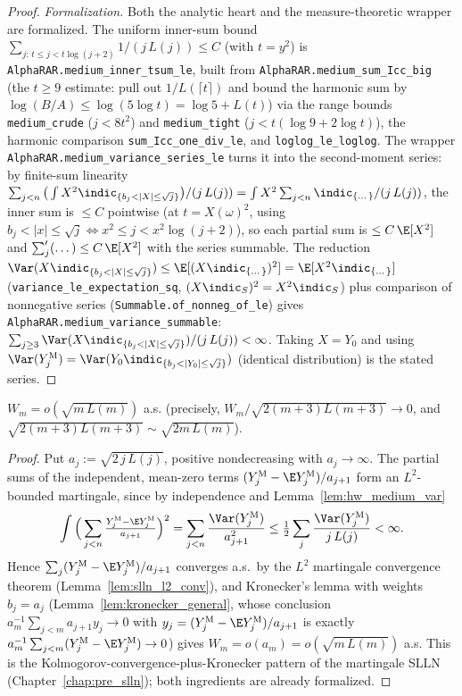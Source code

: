 \begin{proof}
\emph{Formalization.} Both the analytic heart and the measure-theoretic wrapper are formalized.
The uniform inner-sum bound $\sum_{j:\,t\le j<t\log(j+2)}1/(j\,L(j))\le C$ (with $t=y^2$) is
\texttt{AlphaRAR.medium\_inner\_tsum\_le}, built from \texttt{AlphaRAR.medium\_sum\_Icc\_big} (the
$t\ge9$ estimate: pull out $1/L(\lceil t\rceil)$ and bound the harmonic sum by
$\log(B/A)\le\log(5\log t)=\log5+L(t)$) via the range bounds \texttt{medium\_crude} ($j<8t^2$) and
\texttt{medium\_tight} ($j<t(\log9+2\log t)$), the harmonic comparison
\texttt{sum\_Icc\_one\_div\_le}, and \texttt{loglog\_le\_loglog}. The wrapper
\texttt{AlphaRAR.medium\_variance\_series\_le} turns it into the second-moment series: by finite-sum
linearity $\sum_{j<n}\big(\int X^2\indic_{\{b_j<|X|\le\sqrt j\}}\big)/(j\,L(j))=\int X^2\sum_{j<n}
\indic_{\{\dots\}}/(j\,L(j))$, the inner sum is $\le C$ pointwise (at $t=X(\omega)^2$, using
$b_j<|x|\le\sqrt j\iff x^2\le j<x^2\log(j+2)$), so each partial sum is $\le C\,\E[X^2]$ and
$\sum'_j(\dots)\le C\,\E[X^2]$ with the series summable. The reduction
$\Var(X\indic_{\{b_j<|X|\le\sqrt j\}})\le\E[(X\indic_{\{\dots\}})^2]=\E[X^2\indic_{\{\dots\}}]$
(\texttt{variance\_le\_expectation\_sq}, $(X\indic_S)^2=X^2\indic_S$) plus comparison of nonnegative
series (\texttt{Summable.of\_nonneg\_of\_le}) gives \texttt{AlphaRAR.medium\_variance\_summable}:
$\sum_{j\ge3}\Var(X\indic_{\{b_j<|X|\le\sqrt j\}})/(j\,L(j))<\infty$. Taking $X=Y_0$ and using
$\Var(Y_j^{\mathrm M})=\Var(Y_0\indic_{\{b_j<|Y_0|\le\sqrt j\}})$ (identical distribution) is the
stated series.
\end{proof}

\begin{lemma}\label{lem:hw_medium}
\leanok
{}
$W_m=o(\sqrt{m\,L(m)})$ a.s. (precisely, $W_m/\sqrt{2(m+3)L(m+3)}\to0$, and
$\sqrt{2(m+3)L(m+3)}\sim\sqrt{2m\,L(m)}$).
\end{lemma}
\begin{proof}
Put $a_j:=\sqrt{2\,j\,L(j)}$, positive nondecreasing with $a_j\to\infty$. The partial
sums of the independent, mean-zero terms $(Y_j^{\mathrm M}-\E Y_j^{\mathrm M})/a_{j+1}$
form an $L^2$-bounded martingale, since by independence and Lemma~\ref{lem:hw_medium_var}
\[
  \int\Big(\sum_{j<n}\tfrac{Y_j^{\mathrm M}-\E Y_j^{\mathrm M}}{a_{j+1}}\Big)^2
  =\sum_{j<n}\frac{\Var(Y_j^{\mathrm M})}{a_{j+1}^2}
  \le\tfrac12\sum_{j}\frac{\Var(Y_j^{\mathrm M})}{j\,L(j)}<\infty .
\]
Hence $\sum_j(Y_j^{\mathrm M}-\E Y_j^{\mathrm M})/a_{j+1}$ converges a.s.\ by the $L^2$
martingale convergence theorem (Lemma~\ref{lem:slln_l2_conv}), and Kronecker's lemma with
weights $b_j=a_j$ (Lemma~\ref{lem:kronecker_general}, whose conclusion
$a_m^{-1}\sum_{j<m}a_{j+1}y_j\to0$ with $y_j=(Y_j^{\mathrm M}-\E Y_j^{\mathrm M})/a_{j+1}$
is exactly $a_m^{-1}\sum_{j<m}(Y_j^{\mathrm M}-\E Y_j^{\mathrm M})\to0$) gives
$W_m=o(a_m)=o(\sqrt{m\,L(m)})$ a.s. This is the Kolmogorov-convergence-plus-Kronecker
pattern of the martingale SLLN (Chapter~\ref{chap:pre_slln}); both ingredients are
already formalized.
\end{proof}

